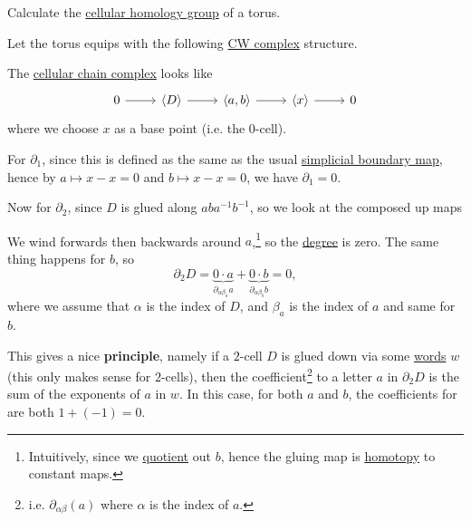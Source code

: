 \begin{eg}
	Calculate the \hyperref[def:cellular-homology-group]{cellular homology group} of a torus.
\end{eg}
\begin{explanation}
	Let the torus equips with the following \hyperref[def:CW-Complex]{CW complex} structure.
	\begin{figure}[H]
		\centering
		\label{fig:eg:lec31:CW-complex-torus}
	\end{figure}

	The \hyperref[def:cellular-chain-complex]{cellular chain complex} looks like
	\[
		\begin{tikzcd}
			0 & {\left<D\right>} & {\left<a, b\right>} & {\left<x\right>} & 0
			\arrow[from=1-1, to=1-2]
			\arrow[from=1-2, to=1-3]
			\arrow[from=1-3, to=1-4]
			\arrow[from=1-4, to=1-5]
		\end{tikzcd}
	\]
	where we choose \(x\) as a base point (i.e. the \(0\)-cell).

	For \(\partial _1\), since this is defined as the same as the usual \hyperref[def:boundary-homomorphism]{simplicial boundary map},
	hence by \(a \mapsto x - x = 0\) and \(b \mapsto x - x = 0\), we have \(\partial_1 = 0\).

	Now for \(\partial _2\), since \(D\) is glued along \(aba^{-1}b^{-1}\), so we look at the composed up maps
	\begin{figure}[H]
		\centering
		\label{fig:eg:cellular-homology-calc-torus}
	\end{figure}
	We wind forwards then backwards around \(a\),\footnote{Intuitively, since we \hyperref[CW-complex-quotient]{quotient} out \(b\),
		hence the gluing map is \hyperref[def:homotopy]{homotopy} to constant maps.} so the \hyperref[def:degree]{degree} is zero.
	The same thing happens for \(b\), so
	\[
		\partial_2 D = \underbrace{0 \cdot a}_{\partial_{\alpha \beta_a }a} + \underbrace{0 \cdot b}_{\partial _{\alpha \beta_b } b} = 0,
	\]
	where we assume that \(\alpha\) is the index of \(D\), and \(\beta _a\) is the index of \(a\) and same for \(b\).

	This gives a nice \textbf{principle}, namely if a \(2\)-cell \(D\) is glued down via some \hyperref[def:word]{words} \(w\) (this only makes sense for \(2\)-cells), then the
	coefficient\footnote{i.e. \(\partial_{\alpha \beta } (a)\) where \(\alpha\) is the index of \(a\).} to a letter \(a\) in \(\partial_2 D\) is the sum of the exponents of \(a\) in \(w\).
	In this case, for both \(a\) and \(b\), the coefficients for are both \(1 + (-1) = 0\).


\end{explanation}
